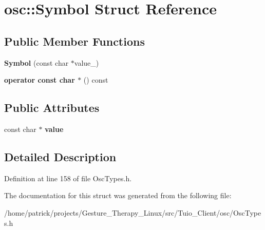 \hypertarget{structosc_1_1_symbol}{}\section{osc\+:\+:Symbol Struct Reference}
\label{structosc_1_1_symbol}
\subsection*{Public Member Functions}
\begin{DoxyCompactItemize}
\item 
\mbox{\label{structosc_1_1_symbol_ad828b30f45500f65bf77efb6a7d802a3}} 
{\bfseries Symbol} (const char $\ast$value\+\_\+)
\item 
\mbox{\label{structosc_1_1_symbol_a14c4d291c3124193526b8c4f312c2f57}} 
{\bfseries operator const char $\ast$} () const
\end{DoxyCompactItemize}
\subsection*{Public Attributes}
\begin{DoxyCompactItemize}
\item 
\mbox{\label{structosc_1_1_symbol_ab953912b0ff8fc39a3b7e80049ee0d68}} 
const char $\ast$ {\bfseries value}
\end{DoxyCompactItemize}


\subsection{Detailed Description}


Definition at line 158 of file Osc\+Types.\+h.



The documentation for this struct was generated from the following file\+:\begin{DoxyCompactItemize}
\item 
/home/patrick/projects/\+Gesture\+\_\+\+Therapy\+\_\+\+Linux/src/\+Tuio\+\_\+\+Client/osc/Osc\+Types.\+h\end{DoxyCompactItemize}
